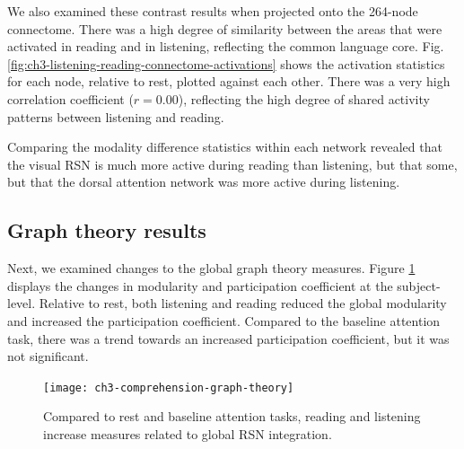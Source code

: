 We also examined these contrast results when projected onto the 264-node connectome. There was a high degree of similarity between the areas that were activated in reading and in listening, reflecting the common language core. Fig. \ref{fig:ch3-listening-reading-connectome-activations} shows the activation statistics for each node, relative to rest, plotted against each other. There was a very high correlation coefficient ($r = 0.00$), reflecting the high degree of shared activity patterns between listening and reading.


Comparing the modality difference statistics within each network revealed that the visual RSN is much more active during reading than listening, but that some, but that the dorsal attention network was more active during listening.



\subsection{Graph theory results}

Next, we examined changes to the global graph theory measures. Figure \ref{fig:ch3-comprehension-graph-theory} displays the changes in modularity and participation coefficient at the subject-level. Relative to rest, both listening and reading reduced the global modularity and increased the participation coefficient. Compared to the baseline attention task, there was  a trend towards an increased participation coefficient, but it was not significant. 

\begin{figure}[t]
	\centering
	\texttt{[image: ch3-comprehension-graph-theory]}
    \caption[Language induces more integrated global network architecture.]{Compared to rest and baseline attention tasks, reading and listening increase measures related to global RSN integration.}
	\label{fig:ch3-comprehension-graph-theory}
\end{figure}

